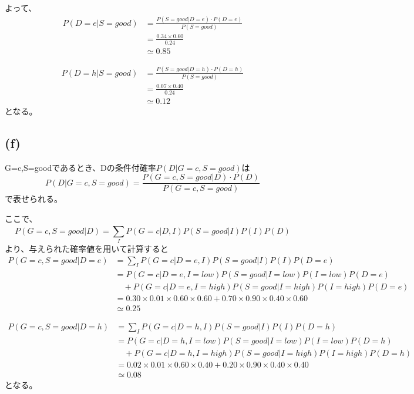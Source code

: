 \documentclass[a4paper,11pt,dvipdfmx]{jsarticle}
\begin{document}
よって、
\begin{align*}
    P(D = e|S=good)    &= \frac{P(S=good|D = e) \cdot P(D = e)}{P(S=good)}\\
                        &= \frac{0.34 \times 0.60}{0.24}\\
                        &\simeq 0.85
\end{align*}

\begin{align*}
    P(D = h|S=good)    &= \frac{P(S=good|D = h) \cdot P(D = h)}{P(S=good)}\\
                        &= \frac{0.07 \times 0.40}{0.24}\\
                        &\simeq 0.12
\end{align*}
となる。

\subsection*{(f)}
G=c,S=goodであるとき、Dの条件付確率$P(D|G=c,S=good)$は
\[P(D|G=c,S=good)=\frac{P(G=c,S=good|D) \cdot P(D)}{P(G=c,S=good)}\]
で表せられる。

ここで、
\[P(G=c,S=good|D) = \sum_{I}^{}P(G=c|D,I)P(S=good|I)P(I)P(D)\]
より、与えられた確率値を用いて計算すると
\begin{align*}
    P(G=c,S=good|D = e)    &= \sum_{I}^{}P(G=c|D=e,I)P(S=good|I)P(I)P(D=e)\\
                            &= P(G=c|D=e,I = low)P(S=good|I = low)P(I = low)P(D=e)\\
                            &\quad + P(G=c|D=e,I = high)P(S=good|I = high)P(I = high)P(D=e)\\
                            &= 0.30 \times 0.01 \times 0.60 \times 0.60 + 0.70 \times 0.90 \times 0.40 \times 0.60\\
                            &\simeq 0.25
\end{align*}

\begin{align*}
    P(G=c,S=good|D = h)    &= \sum_{I}^{}P(G=c|D=h,I)P(S=good|I)P(I)P(D=h)\\
                            &= P(G=c|D=h,I = low)P(S=good|I = low)P(I = low)P(D=h)\\
                            &\quad + P(G=c|D=h,I = high)P(S=good|I = high)P(I = high)P(D=h)\\
                            &= 0.02 \times 0.01 \times 0.60 \times 0.40 + 0.20 \times 0.90 \times 0.40 \times 0.40\\
                            &\simeq 0.08
\end{align*}
となる。
\end{document}

